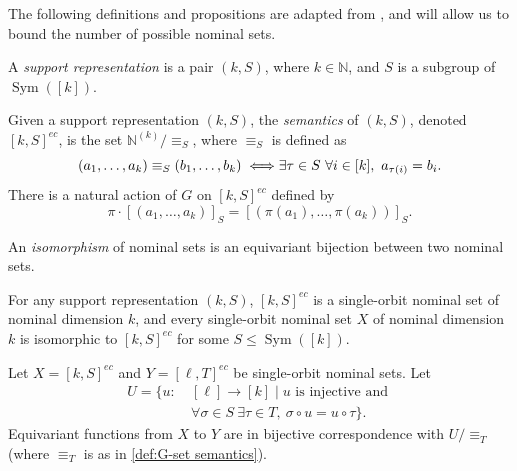 \documentclass[runningheads]{llncs}
\newcommand{\bb}{\mathbb}
\DeclareMathOperator{\Sym}{Sym}
\begin{document}
The following definitions and propositions are adapted from \cite[Section 9]{bojanczyk-klin-lasota:automata-theory-in-nominal-sets}, and will allow us to bound the number of possible nominal sets.

\begin{definition}
    A \emph{support representation} is a pair $(k,S)$, where $k \in \bb N$, and $S$ is a subgroup of $\Sym([k])$. 
\end{definition}

\begin{definition} \label{def:G-set semantics}
    Given a support representation $(k,S)$, the \emph{semantics} of $(k,S)$, denoted $[k,S]^{ec}$, is the set $\bb N^{(k)} / \equiv_S$, where $\equiv_S$ is defined as
    \[
    (a_1, \ldots, a_k) \equiv_S (b_1, \ldots, b_k) \iff \\ \exists \tau \in S \ \forall i \in [k], \ a_{\tau(i)} = b_i .
    \]
    There is a natural action of $G$ on $[k,S]^{ec}$ defined by 
    \[
    \pi \cdot [(a_1, \ldots, a_k)]_S = [(\pi(a_1), \ldots, \pi(a_k))]_S.
    \]
\end{definition}

An \emph{isomorphism} of nominal sets is an equivariant bijection between two nominal sets.

\begin{proposition} \label{prop:characterization of single-orbit nominal sets}
    For any support representation $(k,S)$, $[k,S]^{ec}$ is a single-orbit nominal set of nominal dimension $k$, and every single-orbit nominal set $X$ of nominal dimension $k$ is isomorphic to $[k,S]^{ec}$ for some $S \leq \Sym([k])$. 
\end{proposition}

\begin{proposition} \label{prop:characterization of equivariant functions}
    Let $X = [k,S]^{ec}$ and $Y = [\ell,T]^{ec}$ be single-orbit nominal sets. 
    Let 
    \begin{align*}
        U = \{u : \ &[\ell] \to [k] \mid u \text{ is injective and } \\ 
        &\forall \sigma \in S  \ \exists \tau \in T, \ \sigma \circ u = u \circ \tau\}.
    \end{align*}
    Equivariant functions from $X$ to $Y$ are in bijective correspondence with $U / \equiv_T$ (where $\equiv_T$ is as in \autoref{def:G-set semantics}).
\end{proposition}
\end{document}
